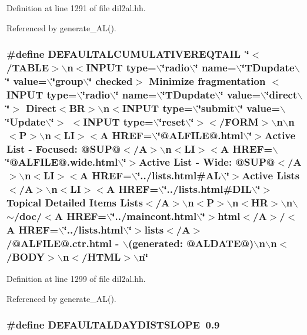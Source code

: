 Definition at line 1291 of file dil2al.hh.

Referenced by generate\_\-AL().
\subsubsection{\setlength{\rightskip}{0pt plus 5cm}\#define DEFAULTALCUMULATIVEREQTAIL\ \char`\"{}$<$/TABLE$>$$\backslash$n$<$INPUT type=$\backslash$\char`\"{}radio$\backslash$\char`\"{} name=$\backslash$\char`\"{}TDupdate$\backslash$\char`\"{} value=$\backslash$\char`\"{}group$\backslash$\char`\"{} checked$>$ Minimize fragmentation $<$INPUT type=$\backslash$\char`\"{}radio$\backslash$\char`\"{} name=$\backslash$\char`\"{}TDupdate$\backslash$\char`\"{} value=$\backslash$\char`\"{}direct$\backslash$\char`\"{}$>$ Direct$<$BR$>$$\backslash$n$<$INPUT type=$\backslash$\char`\"{}submit$\backslash$\char`\"{} value=$\backslash$\char`\"{}Update$\backslash$\char`\"{}$>$ $<$INPUT type=$\backslash$\char`\"{}reset$\backslash$\char`\"{}$>$$<$/FORM$>$$\backslash$n$\backslash$n$<$P$>$$\backslash$n$<$LI$>$$<$A HREF=$\backslash$\char`\"{}@ALFILE@.html$\backslash$\char`\"{}$>$Active List - Focused: @SUP@$<$/A$>$$\backslash$n$<$LI$>$$<$A HREF=$\backslash$\char`\"{}@ALFILE@.wide.html$\backslash$\char`\"{}$>$Active List - Wide: @SUP@$<$/A$>$$\backslash$n$<$LI$>$$<$A HREF=$\backslash$\char`\"{}../lists.html\#AL$\backslash$\char`\"{}$>$Active Lists$<$/A$>$$\backslash$n$<$LI$>$$<$A HREF=$\backslash$\char`\"{}../lists.html\#DIL$\backslash$\char`\"{}$>$Topical Detailed Items Lists$<$/A$>$$\backslash$n$<$P$>$$\backslash$n$<$HR$>$$\backslash$n$\backslash$$\sim$/doc/$<$A HREF=$\backslash$\char`\"{}../maincont.html$\backslash$\char`\"{}$>$html$<$/A$>$/$<$A HREF=$\backslash$\char`\"{}../lists.html$\backslash$\char`\"{}$>$lists$<$/A$>$/@ALFILE@.ctr.html - $\backslash$(generated: @ALDATE@)$\backslash$n$\backslash$n$<$/BODY$>$$\backslash$n$<$/HTML$>$$\backslash$n\char`\"{}}\label{dil2al_8hh_a105}




Definition at line 1299 of file dil2al.hh.

Referenced by generate\_\-AL().
\subsubsection{\setlength{\rightskip}{0pt plus 5cm}\#define DEFAULTALDAYDISTSLOPE\ 0.9}\label{dil2al_8hh_a48}




